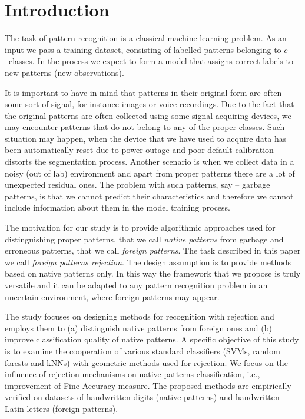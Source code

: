 \documentclass{llncs}
\begin{document}
\vspace{-12pt}
\section{Introduction}
  \label{sec:Introduction}
\vspace{-3pt}

The task of pattern recognition is a classical machine learning problem. As an input we pass a training dataset, consisting of labelled patterns belonging to $c$~classes. In the process we expect to form a model that assigns correct labels to new patterns (new observations).

It is important to have in mind that patterns in their original form are often some sort of signal, for instance images or voice recordings. Due to the fact that the original patterns are often collected using some signal-acquiring devices, we may encounter patterns that do not belong to any of the proper classes. Such situation may happen, when the device that we have used to acquire data has been automatically reset due to power outage and poor default calibration distorts the segmentation process. Another scenario is when we collect data in a noisy (out of lab) environment and apart from proper patterns there are a lot of unexpected residual ones. The problem with such patterns, say -- garbage patterns, is that we cannot predict their characteristics and therefore we cannot include information about them in the model training process.

The motivation for our study is to provide algorithmic approaches used for distinguishing proper patterns, that we call \textit{native patterns} from garbage and erroneous patterns, that we call \textit{foreign patterns}. The task described in this paper we call \textit{foreign patterns rejection}. The design assumption is to provide methods based on native patterns only. In this way the framework that we propose is truly versatile and it can be adapted to any pattern recognition problem in an uncertain environment, where foreign patterns may appear. 

The study focuses on designing methods for recognition with rejection and employs them to (a) distinguish native patterns from foreign ones and (b) improve classification quality of native patterns. A specific objective of this study is to examine the cooperation of various standard classifiers (SVMs, random forests and kNNs) with geometric methods used for rejection. We focus on the influence of rejection mechanisms on native patterns classification, i.e., improvement of Fine Accuracy measure. The proposed methods are empirically verified on datasets of handwritten digits (native patterns) and handwritten Latin letters (foreign patterns).
\end{document}
